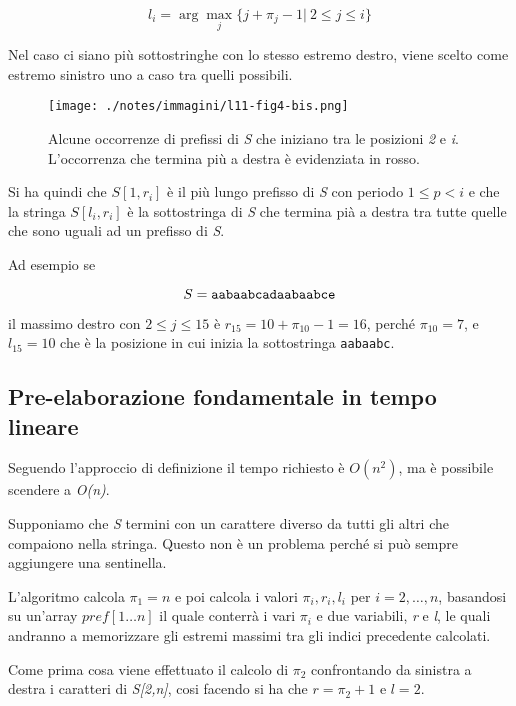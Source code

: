 $$
l_i = \arg\max\limits_{j} \{ j + \pi_j -1 | \: 2 \leq j \leq i\}
$$

Nel caso ci siano più sottostringhe con lo stesso estremo destro, viene scelto come estremo sinistro uno a caso tra quelli possibili.

\begin{figure}[htbp]
	\centering
	\texttt{[image: ./notes/immagini/l11-fig4-bis.png]}
	\caption{Alcune occorrenze di prefissi di \textit{S} che iniziano tra le posizioni \textit{2} e \textit{i}. L'occorrenza che termina più a destra è evidenziata in rosso.}
\end{figure}

Si ha quindi che $ S[1,r_i] $ è il più lungo prefisso di \textit{S} con periodo $ 1 \leq p < i $ e che la stringa $ S[l_i, r_i] $ è la sottostringa di \textit{S} che termina pià a destra tra tutte quelle che sono uguali ad un prefisso di \textit{S}.

Ad esempio se 

$$
S = \text{\texttt{aabaabcadaabaabce}}
$$

il massimo destro con $ 2 \leq j \leq 15 $ è $ r_{15} = 10 + \pi_{10} -1 = 16$, perché $ \pi_{10} = 7$, e $ l_{15} = 10 $ che è la posizione in cui inizia la sottostringa \texttt{aabaabc}.

\subsection{Pre-elaborazione fondamentale in tempo lineare}\label{preambolazione-fondamentale-in-tempo-lineare}

Seguendo l'approccio di definizione il tempo richiesto è
$O(n^2)$, ma è possibile scendere a \emph{O(n)}.

Supponiamo che \emph{S} termini con un carattere diverso da tutti gli
altri che compaiono nella stringa. Questo non è un problema perché si
può sempre aggiungere una sentinella.

L'algoritmo calcola $\pi_1 = n$ e poi calcola i valori $\pi_i, r_i, l_i$ per $i = 2,\ldots, n$, basandosi su un'array $ pref[1\ldots n] $ il quale conterrà i vari $ \pi_i $ e due variabili, \textit{r} e \textit{l}, le quali andranno a memorizzare gli estremi massimi tra gli indici precedente calcolati.

Come prima cosa viene effettuato il calcolo di $ \pi_2 $ confrontando da sinistra a destra i caratteri di \textit{S[2,n]}, cosi facendo si ha che $ r = \pi_2 +1 $ e $l = 2$.

